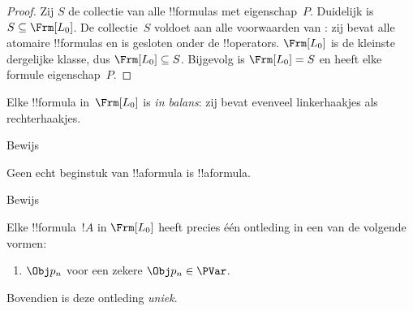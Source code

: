 \documentclass[openany]{memoir}
\begin{document}
\begin{proof}
  Zij $S$ de collectie van alle !!{formula}s met eigenschap~$P$.
  Duidelijk is $S \subseteq \Frm[L_0]$. De collectie~$S$ voldoet aan
  alle voorwaarden van : zij bevat alle
  atomaire !!{formula}s en is gesloten onder de !!{operator}s.
  $\Frm[L_0]$ is de kleinste dergelijke klasse, dus
  $\Frm[L_0] \subseteq S$. Bijgevolg is $\Frm[L_0] = S$ en heeft elke
  formule eigenschap~$P$.
\end{proof}

\begin{prop}
   Elke !!{formula} in~$\Frm[L_0]$ is \emph{in balans}: zij bevat
   evenveel linkerhaakjes als rechterhaakjes.
\end{prop}

\begin{prob}
Bewijs 
\end{prob}

\begin{prop} 
Geen echt beginstuk van !!a{formula} is !!a{formula}.
\end{prop}

\begin{prob}
  Bewijs 
\end{prob}

\begin{prop}
Elke !!{formula}~$!A$ in $ \Frm[L_0]$ heeft precies één ontleding in
een van de volgende vormen:
\begin{enumerate}


\item $\Obj p_n$ voor een zekere $\Obj p_n \in  \PVar$.
  




\end{enumerate}
Bovendien is deze ontleding \emph{uniek}.
\end{prop}
\end{document}
